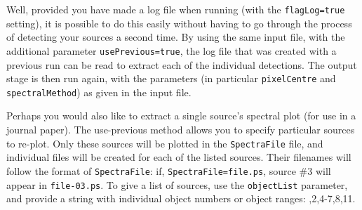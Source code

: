 Well, provided you have made a log file when running \duchamp (with
the \texttt{flagLog=true} setting), it is possible to do this easily
without having to go through the process of detecting your sources a
second time. By using the same input file, with the additional
parameter \texttt{usePrevious=true}, the log file that was created
with a previous \duchamp run can be read to extract each of the
individual detections. The output stage is then run again, with the
parameters (in particular \texttt{pixelCentre} and
\texttt{spectralMethod}) as given in the input file. 

Perhaps you would also like to extract a single source's
spectral plot (\eg for use in a journal paper). The use-previous
method allows you to specify particular sources to re-plot. Only these
sources will be plotted in the \texttt{SpectraFile} file, and
individual files will be created for each of the listed sources. Their
filenames will follow the format of \texttt{SpectraFile}: if,
\texttt{SpectraFile=file.ps}, source \#3 will appear in
\texttt{file-03.ps}. To give a list of sources, use the
\texttt{objectList} parameter, and provide a string with individual
object numbers or object ranges: ,2,4-7,8,11.